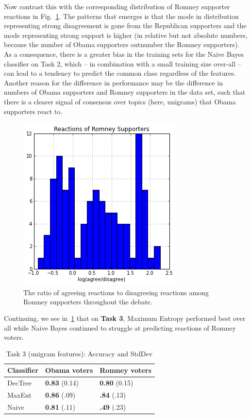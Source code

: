 Now contrast this with the corresponding distribution of Romney supporter reactions in Fig.~\ref{fig:ngramsbalancerom}.  The patterns that emerges is that the mode in distribution representing strong disagreement is gone from the Republican supporters and the mode representing strong support is higher (in relative but not absolute numbers, because the number of Obama supporters outnumber the Romney supporters).  As a consequence, there is a greater bias in the training sets for the Naive Bayes classifier on Task 2, which -- in combination with a small training size over-all -- can lead to a tendency to predict the common class regardless of the features.  Another reason for the difference in performance may be the difference in numbers of Obama supporters and Romney supporters in the data set, such that there is a clearer signal of consensus over topics (here, unigrams) that Obama supporters react to. 

\begin{figure}[]
	\centering
	\includegraphics[scale=0.60]{Figures/ngrams_balance_rom.png}
	\caption{The ratio of agreeing reactions to disagreeing reactions among Romney supporters throughout the debate.}
	\label{fig:ngramsbalancerom}
\end{figure}

Continuing, we see in~\ref{tab:task3unigrams} that on \textbf{Task 3}, Maximum Entropy performed best over all while Naive Bayes continued to struggle at predicting reactions of Romney voters.

\begin{table}[]
\begin{centering}
\begin{tabular}{ l | l | l }
Classifier & Obama voters & Romney voters \\
\hline
DecTree & \textbf{0.83} (0.14) &  \textbf{0.80} (0.15) \\
MaxEnt & \textbf{0.86} (.09) &  \textbf{.84} (.13) \\
Naive & \textbf{0.81} (.11) &  \textbf{.49} (.23) \\
\end{tabular}
\caption{Task 3 (unigram features): Accuracy and StdDev}
\label{tab:task3unigrams}
\end{centering}
\end{table}

